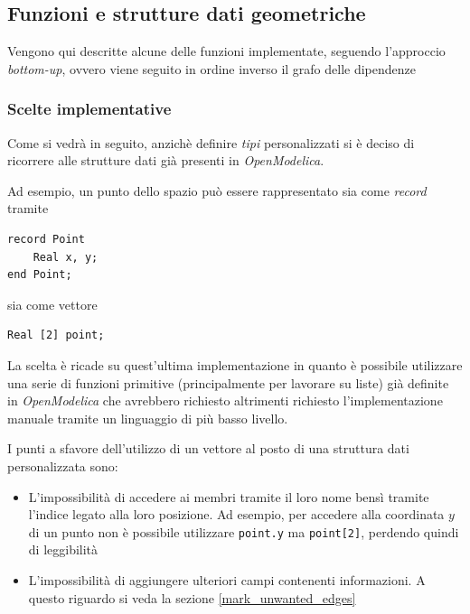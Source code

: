 \documentclass[10pt,a4paper]{article}
\begin{document}
\subsection{Funzioni e strutture dati geometriche}

Vengono qui descritte alcune delle funzioni implementate, seguendo l'approccio \textit{bottom-up}, ovvero viene seguito in ordine inverso il grafo delle dipendenze

\subsubsection{Scelte implementative}

Come si vedrà in seguito, anzichè definire \textit{tipi} personalizzati si è deciso di ricorrere alle strutture dati già presenti in \textit{OpenModelica}.

Ad esempio, un punto dello spazio può essere rappresentato sia come \textit{record} tramite

\begin{lstlisting}[language=Modelica]
record Point
	Real x, y;
end Point;
\end{lstlisting}

sia come vettore

\begin{lstlisting}[language=Modelica]
Real [2] point;
\end{lstlisting}

La scelta è ricade su quest'ultima implementazione in quanto è possibile utilizzare una serie di funzioni primitive (principalmente per lavorare su liste) già definite in \textit{OpenModelica} che avrebbero richiesto altrimenti richiesto l'implementazione manuale tramite un linguaggio di più basso livello.

I punti a sfavore dell'utilizzo di un vettore al posto di una struttura dati personalizzata sono:

\begin{itemize}
	\item L'impossibilità di accedere ai membri tramite il loro nome bensì tramite l'indice legato alla loro posizione. Ad esempio, per accedere alla coordinata $y$ di un punto non è possibile utilizzare \verb|point.y| ma \verb|point[2]|, perdendo quindi di leggibilità
	\item L'impossibilità di aggiungere ulteriori campi contenenti informazioni. A questo riguardo si veda la sezione \ref{mark_unwanted_edges}
\end{itemize}
\end{document}
